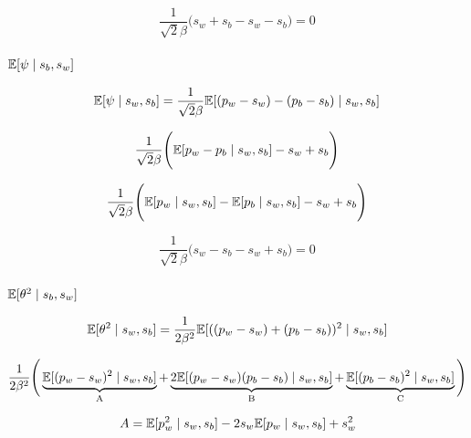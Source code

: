 \documentclass[a4paper,11pt]{article}
\theoremstyle{mytheor}
\newcommand{\E}{\Bbb{E}}
\begin{document}
\begin{equation}
    \label{e_theta_4}
    \frac{1}{\sqrt{2}\beta} \Bigg( s_w+s_b-s_w-s_b \Bigg) = 0
\end{equation}

\subsubsection{$\E[\psi \mid s_b,s_w]$}

\begin{equation}
    \label{e_psi}
    \Bbb{E}[\psi\mid s_w,s_b] = \frac{1}{\sqrt{2}\beta}\Bbb{E}[(p_w-s_w)-(p_b-s_b) \mid s_w,s_b]
\end{equation}

\begin{equation}
    \label{e_psi_2}
    \frac{1}{\sqrt{2}\beta} \Bigg( \Bbb{E}[p_w-p_b \mid s_w,s_b]-s_w+s_b \Bigg)
\end{equation}

\begin{equation}
    \label{e_psi_3}
    \frac{1}{\sqrt{2}\beta} \Bigg( \Bbb{E}[p_w\mid s_w,s_b] - \Bbb{E}[p_b \mid s_w,s_b]-s_w+s_b \Bigg)
\end{equation}


\begin{equation}
    \label{e_psi_4}
    \frac{1}{\sqrt{2}\beta} \Bigg( s_w-s_b-s_w+s_b \Bigg) = 0
\end{equation}


\subsubsection{$\E[\theta^2 \mid s_b,s_w]$}

\begin{equation}
    \label{e_theta_sq}
    \Bbb{E}[\theta^2\mid s_w,s_b] = \frac{1}{2\beta^2}\Bbb{E}[((p_w-s_w)+(p_b-s_b))^2 \mid s_w,s_b]
\end{equation}

\begin{equation}
    \label{e_theta_sq_2}
    \frac{1}{2\beta^2} \Bigg( \underbrace{\Bbb{E}[(p_w-s_w)^2\mid s_w,s_b]}_\text{A} + \underbrace{2\Bbb{E}[(p_w-s_w)(p_b-s_b)\mid s_w,s_b]}_\text{B} + \underbrace{\Bbb{E}[(p_b-s_b)^2\mid s_w,s_b]}_\text{C} \Bigg)
\end{equation}

\begin{equation}
    \label{e_theta_sq_2_a}
    A=\Bbb{E}[p_w^2\mid s_w,s_b] - 2s_w\Bbb{E}[p_w\mid s_w,s_b] + s_{w}^{2}
\end{equation}
\end{document}

